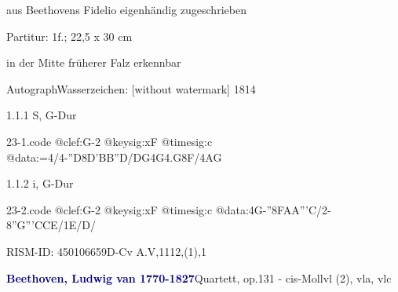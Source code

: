 \documentclass[a4paper, twocolumn, 11pt]{book}
\begin{document}
\par \begin{itshape} aus Beethovens Fidelio eigenhändig zugeschrieben\end{itshape} 
\par \textcolor{darkblue}{}  Partitur: 1f.; 22,5 x 30 cm\newline \begin{small} in der Mitte früherer Falz erkennbar\end{small} \newline Autograph\newline Wasserzeichen: [without watermark]  1814
\par 1.1.1  S, G-Dur\newline \begin{footnotesize}  \end{footnotesize}  
\begin{filecontents*}{23-1.code}
@clef:G-2
@keysig:xF
@timesig:c
@data:=4/4-''D{8D'B}{B''D}/{DG}4G4.G8F/4AG
\end{filecontents*}
\newline %
\par 1.1.2  i, G-Dur  
\begin{filecontents*}{23-2.code}
@clef:G-2
@keysig:xF
@timesig:c
@data:4G-''{8FA}{A'''C}/2-8{''G'''C}{CE}/1E/D/
\end{filecontents*}
\newline %
\par RISM-ID: 450106659\newline D-Cv  A.V,1112,(1),1
\par \vspace{16pt} \textcolor{darkblue}{\textbf{Beethoven, Ludwig van  1770-1827}}\hfillplus{[24]}\newline Quartett, op.131 - cis-Moll\newline vl (2), vla, vlc
\par \begin{itshape}\end{itshape} 
\end{document}
